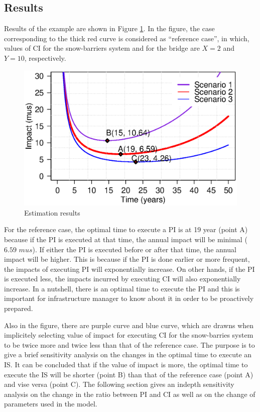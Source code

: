 \documentclass[fleqn]{article}
\begin{document}
\subsection{Results}
Results of the example are shown in Figure \ref{results}. In the figure, the case corresponding to the thick red curve is considered as ``reference case'', in which, values of CI for the snow-barriers system and for the bridge are $X=2$ and $Y=10$, respectively.
\begin{figure}[H]
  \begin{center}
    \includegraphics[width=0.8\linewidth]{results}
    \caption{Estimation results}
    \label{results}
  \end{center}
\end{figure}

For the reference case, the optimal time to execute a PI is at 19 year (point A) because if the PI is executed at that time, the annual impact will be minimal ($6.59$ $mus$). If either the PI is executed before or after that time, the annual impact will be higher. This is because if the PI is done earlier or more frequent, the impacts of executing PI will exponentially increase. On other hands, if the PI is executed less, the impacts incurred by executing CI will also exponentially increase. In a nutshell, there is an optimal time to execute the PI and this is important for infrastructure manager to know about it in order to be proactively prepared.

Also in the figure, there are purple curve and blue curve, which are drawns when implicitely selecting value of impact for executing CI for the snow-barries system to be twice more and twice less than that of the reference case. The purpose is to give a brief sensitivity analysis on the changes in the optimal time to execute an IS. It can be concluded that if the value of impact is more, the optimal time to execute the IS will be shorter (point B) than that of the reference case (point A) and vise versa (point C). The following section gives an indepth sensitivity analysis on the change in the ratio between PI and CI as well as on the change of parameters used in the model.
\end{document}
